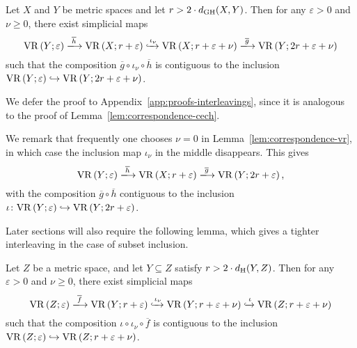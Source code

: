 \documentclass[11pt, reqno, english]{amsart}
\newcommand{\og}{\overline{g}}
\newcommand{\oh}{\overline{h}}
\newcommand{\of}{\overline{f}}
\begin{document}
\vspace{3mm}
\begin{lemma}
\label{lem:correspondence-vr}
Let $X$ and $Y$ be metric spaces and let $r > 2\cdot d_{\mathrm{GH}}(X,Y)$.
Then for any $\varepsilon > 0$ and $\nu\geq0$, there exist simplicial maps
\[\vr{Y}{\varepsilon} \xlongrightarrow{\oh} \vr{X}{r+\varepsilon} \xhookrightarrow{\iota_\nu} \vr{X}{r+\varepsilon+\nu}
\xlongrightarrow{\og} \vr{Y}{2r+\varepsilon+\nu}\] 
such that the composition $\og\circ\iota_\nu\circ\oh$ is contiguous to the inclusion $\mathrm{VR}\left(Y;\varepsilon\right)\hookrightarrow\mathrm{VR}\left(Y;2r+\varepsilon+\nu\right)$.
\end{lemma}
\vspace{3mm}

We defer the proof to Appendix~\ref{app:proofs-interleavings}, since it is analogous to the proof of Lemma~\ref{lem:correspondence-cech}.

\begin{remark}
We remark that frequently one chooses $\nu=0$ in Lemma~\ref{lem:correspondence-vr}, in which case the inclusion map $\iota_\nu$ in the middle disappears.
This gives
\[\vr{Y}{\varepsilon} \xlongrightarrow{\oh} \vr{X}{r+\varepsilon} \xlongrightarrow{\og} \vr{Y}{2r+\varepsilon},\]
with the composition $\og\circ\oh$ contiguous to the inclusion $\iota\colon\mathrm{VR}\left(Y;\varepsilon\right)\hookrightarrow\mathrm{VR}\left(Y;2r+\varepsilon\right)$.
\end{remark}

Later sections will also require the following lemma, which gives a tighter interleaving in the case of subset inclusion.

\vspace{3mm}
\begin{lemma}
\label{lem:rips-hausdorff}
Let $Z$ be a metric space, and let $Y\subseteq Z$ satisfy $r>2\cdot d_{\mathrm{H}}(Y,Z)$.
Then for any $\varepsilon > 0$ and $\nu \ge 0$, there exist simplicial maps
\[\vr{Z}{\varepsilon} \xlongrightarrow{\of} \vr{Y}{r+\varepsilon} \xhookrightarrow{\iota_\nu} \vr{Y}{r+\varepsilon+\nu}
\xhookrightarrow{\iota} \vr{Z}{r+\varepsilon+\nu}\]
such that the composition $\iota \circ \iota_\nu \circ \of$ is contiguous to the inclusion $\mathrm{VR}\left(Z;\varepsilon\right)\hookrightarrow\mathrm{VR}\left(Z;r+\varepsilon+\nu\right)$.
\end{lemma}
\vspace{3mm}
\end{document}

